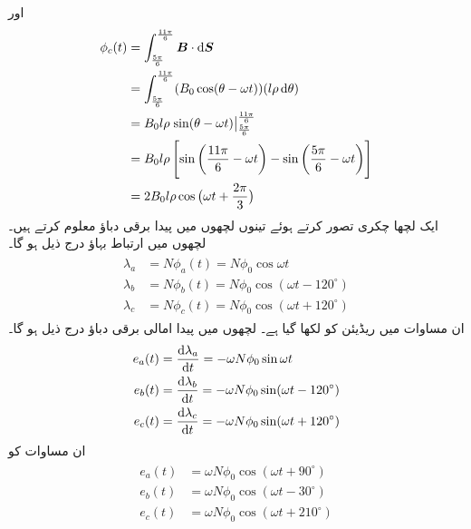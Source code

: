 اور
\begin{gather}
\begin{aligned}
\phi_c(t)&=\int_{\frac{5\pi}{6}}^{\frac{11\pi}{6}} \kvec{B} \cdot \dif \kvec{S}\\
&=\int_{\frac{5\pi}{6}}^{\frac{11\pi}{6}} (B_0 \cos (\theta-\omega t))(l \rho \dif \theta)\\
&=B_0 l \rho \left. \sin (\theta-\omega t) \right\vert_{\frac{5\pi}{6}}^{\frac{11\pi}{6}}\\
&=B_0 l \rho \left[\sin \left(\frac{11\pi}{6}-\omega t \right )-\sin \left (\frac{5\pi}{6}-\omega t \right) \right]\\
&=2 B_0 l \rho \cos \big(\omega t+\frac{2\pi}{3}\big)
\end{aligned}
\end{gather}
ایک لچھا   چکری تصور کرتے ہوئے تینوں لچھوں میں پیدا برقی دباؤ معلوم کرتے ہیں۔لچھوں میں ارتباط بہاؤ درج ذیل ہو گا۔
\begin{gather}
\begin{aligned}\label{مساوات_گھومتے_مشین_ارتباط_بہاو_تینوں}
\lambda_a&=N \phi_a (t)=N \phi_0 \cos \omega t\\
\lambda_b&=N \phi_b (t)=N \phi_0 \cos (\omega t-120^{\circ})\\
\lambda_c&=N \phi_c (t)=N \phi_0 \cos (\omega t+120^{\circ})
\end{aligned}
\end{gather}
ان مساوات میں  ریڈیئن کو  لکھا گیا ہے۔ لچھوں میں پیدا امالی برقی دباؤ درج ذیل ہو گا۔
\begin{gather}
\begin{aligned}\label{مساوات_گھومتے_مشین_تین_دور_سائن_نما_برقی_دباو_الف}
e_a(t)&=\frac{\dif \lambda_a}{\dif t}=-\omega N \phi_0 \sin \omega t\\
e_b(t)&=\frac{\dif \lambda_b}{\dif t}=-\omega N \phi_0 \sin (\omega t-120^{\circ})\\
e_c(t)&=\frac{\dif \lambda_c}{\dif t}=-\omega N \phi_0 \sin (\omega t+120^{\circ})
\end{aligned}
\end{gather}
ان مساوات کو 
\begin{gather}
\begin{aligned}\label{مساوات_گھومتے_مشین_تین_دور_سائن_نما_برقی_دباو}
e_a(t)&=\omega N \phi_0 \cos (\omega t +90^{\circ})\\
e_b(t)&=\omega N \phi_0 \cos (\omega t-30^{\circ})\\
e_c(t)&=\omega N \phi_0 \cos (\omega t+210^{\circ})
\end{aligned}
\end{gather}
